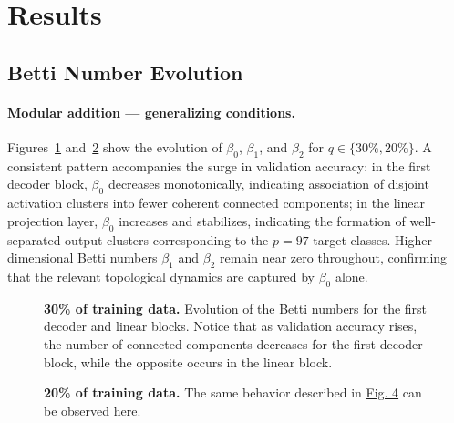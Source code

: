 \section{Results}
\label{sec:results}

\subsection{Betti Number Evolution}
\label{subsec:results_betti}

\paragraph{Modular addition — generalizing conditions.}
Figures~\ref{fig:sum-decoder0-linear-30pct} and~\ref{fig:sum-decoder0-linear-20pct} show the evolution of $\beta_0$, $\beta_1$, and $\beta_2$ for $q \in \{30\%, 20\%\}$. A consistent pattern accompanies the surge in validation accuracy: in the first decoder block, $\beta_0$ decreases monotonically, indicating association of disjoint activation clusters into fewer coherent connected components; in the linear projection layer, $\beta_0$ increases and stabilizes, indicating the formation of well-separated output clusters corresponding to the $p = 97$ target classes. Higher-dimensional Betti numbers $\beta_1$ and $\beta_2$ remain near zero throughout, %
confirming that the relevant topological dynamics are captured by $\beta_0$ alone.

\begin{figure}
    
    
    \caption[30\% of training data.]{\textbf{30\% of training data.} Evolution of the Betti numbers for the first decoder and linear blocks. Notice that as validation accuracy rises, the number of connected components decreases for the first decoder block, while the opposite occurs in the linear block.}
    \label{fig:sum-decoder0-linear-30pct}
\end{figure}

\begin{figure}
    
    
    \caption[20\% of training data.]{\textbf{20\% of training data.} The same behavior described in \hyperref[fig:sum-decoder0-linear-30pct]{Fig. 4} can be observed here.}
    \label{fig:sum-decoder0-linear-20pct}
\end{figure}

